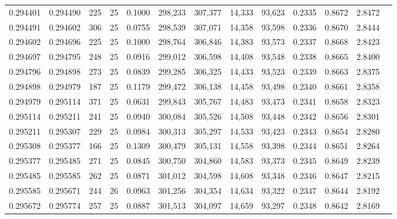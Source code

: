 \begin{tabular}{rrrrrrrrrrrrr}
0.294401 & 0.294490 &   225 &  25 &                                     0.1000 & 298,233 & 307,377 &  14,333 &  93,623 & 0.2335 & 0.8672 & 2.8472 \\
0.294491 & 0.294602 &   306 &  25 &                                     0.0755 & 298,539 & 307,071 &  14,358 &  93,598 & 0.2336 & 0.8670 & 2.8444 \\
0.294602 & 0.294696 &   225 &  25 &                                     0.1000 & 298,764 & 306,846 &  14,383 &  93,573 & 0.2337 & 0.8668 & 2.8423 \\
0.294697 & 0.294795 &   248 &  25 &                                     0.0916 & 299,012 & 306,598 &  14,408 &  93,548 & 0.2338 & 0.8665 & 2.8400 \\
0.294796 & 0.294898 &   273 &  25 &                                     0.0839 & 299,285 & 306,325 &  14,433 &  93,523 & 0.2339 & 0.8663 & 2.8375 \\
0.294898 & 0.294979 &   187 &  25 &                                     0.1179 & 299,472 & 306,138 &  14,458 &  93,498 & 0.2340 & 0.8661 & 2.8358 \\
0.294979 & 0.295114 &   371 &  25 &                                     0.0631 & 299,843 & 305,767 &  14,483 &  93,473 & 0.2341 & 0.8658 & 2.8323 \\
0.295114 & 0.295211 &   241 &  25 &                                     0.0940 & 300,084 & 305,526 &  14,508 &  93,448 & 0.2342 & 0.8656 & 2.8301 \\
0.295211 & 0.295307 &   229 &  25 &                                     0.0984 & 300,313 & 305,297 &  14,533 &  93,423 & 0.2343 & 0.8654 & 2.8280 \\
0.295308 & 0.295377 &   166 &  25 &                                     0.1309 & 300,479 & 305,131 &  14,558 &  93,398 & 0.2344 & 0.8651 & 2.8264 \\
0.295377 & 0.295485 &   271 &  25 &                                     0.0845 & 300,750 & 304,860 &  14,583 &  93,373 & 0.2345 & 0.8649 & 2.8239 \\
0.295485 & 0.295585 &   262 &  25 &                                     0.0871 & 301,012 & 304,598 &  14,608 &  93,348 & 0.2346 & 0.8647 & 2.8215 \\
0.295585 & 0.295671 &   244 &  26 &                                     0.0963 & 301,256 & 304,354 &  14,634 &  93,322 & 0.2347 & 0.8644 & 2.8192 \\
0.295672 & 0.295774 &   257 &  25 &                                     0.0887 & 301,513 & 304,097 &  14,659 &  93,297 & 0.2348 & 0.8642 & 2.8169 \\

\end{tabular}
